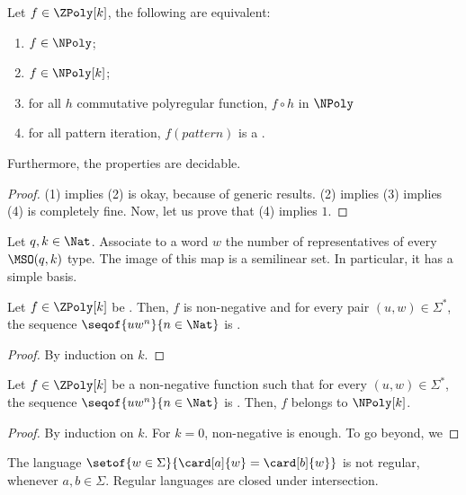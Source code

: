 \begin{theorem}
    \label{decide-n-poly-general:thm}
    Let $f \in \ZPoly[k]$, the following are equivalent:
    \begin{enumerate}
        \item $f \in \NPoly$;
        \item $f \in \NPoly[k]$;
        \item for all $h$ commutative polyregular function,
            $f \circ h$ in $\NPoly$
        \item for all pattern iteration,
            $f(pattern)$ is a .
    \end{enumerate}
    Furthermore, the properties are decidable.
\end{theorem}
\begin{proof}
    (1) implies (2) is okay, because of generic results.
    (2) implies (3) implies (4) is completely fine.
    Now, let us prove that (4) implies $1$.
\end{proof}



\begin{conjecture}
    Let $q,k \in \Nat$.
    Associate to a word $w$ the number of representatives
    of every $\MSO(q,k)$ type. 
    The image of this map is a semilinear set.
    In particular, it has a simple basis.
\end{conjecture}

\begin{conjecture}
    Let $f \in \ZPoly[k]$
    be .
    Then, $f$ is non-negative and for every pair
    $(u,w) \in \Sigma^*$,
    the sequence $\seqof{u w^n}{n \in \Nat}$
    is .
\end{conjecture}
\begin{proof}
    By induction on $k$.
\end{proof}

\begin{conjecture}
    Let $f \in \ZPoly[k]$
    be a non-negative function such that for every
    $(u,w) \in \Sigma^*$,
    the sequence $\seqof{u w^n}{n \in \Nat}$
    is .
    Then, $f$ belongs to $\NPoly[k]$.
\end{conjecture}
\begin{proof}
    By induction on $k$.
    For $k = 0$, non-negative is enough.
    To go beyond, we

\end{proof}


\begin{fact}
    \label{regular:fact}
    The language $\setof{ w \in \Sigma}{ \card[a]{w} = \card[b]{w}}$
    is not regular, whenever $a,b \in \Sigma$.
    Regular languages are closed under intersection.
\end{fact}
